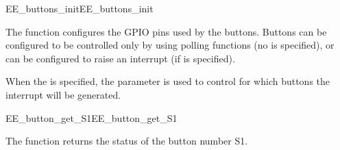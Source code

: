 \begin{function_nopb2}{EE\_buttons\_init}{EE_buttons_init}
  
  \begin{fundescription}
    The function configures the GPIO pins used by the buttons. Buttons
    can be configured to be controlled only by using polling functions
    (no  is specified), or can be configured to raise
    an interrupt (if  is specified).

    When the  is specified, the  parameter
    is used to control for which buttons the interrupt will be
    generated.
  \end{fundescription}
  
  \begin{funparameters}

  \end{funparameters}
  
  \begin{funreturn}
  \end{funreturn}
  
\end{function_nopb2}

\begin{function_nopb2}{EE\_button\_get\_S1}{EE_button_get_S1}
  
  \begin{fundescription}
    The function returns the status of the button number S1.
  \end{fundescription}
  
  
  \begin{funreturn}
  \end{funreturn}
  
\end{function_nopb2}

